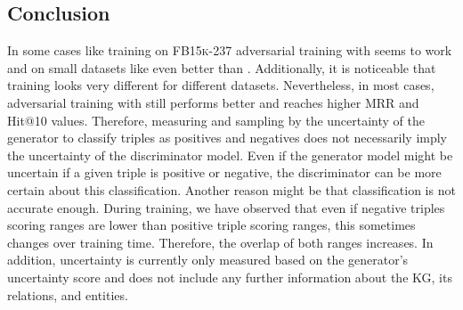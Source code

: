 \subsection{Conclusion}
\label{subsec:uncertainty_conclusion}
%
In some cases like training on \textsc{FB15k-237} adversarial training with \ussoftmax seems to work and on small datasets like \umls even better than \origsampling.
Additionally, it is noticeable that training looks very different for different datasets.
Nevertheless, in most cases, adversarial training with \origsampling still performs better and reaches higher MRR and Hit@10 values.
Therefore, measuring and sampling by the uncertainty of the generator to classify triples as positives and negatives does not necessarily imply the uncertainty of the discriminator model.
Even if the generator model might be uncertain if a given triple is positive or negative, the discriminator can be more certain about this classification.
Another reason might be that classification is not accurate enough.
During training, we have observed that even if negative triples scoring ranges are lower than positive triple scoring ranges, this sometimes changes over training time.
Therefore, the overlap of both ranges increases.
In addition, uncertainty is currently only measured based on the generator's uncertainty score and does not include any further information about the \ac{KG}, its relations, and entities.


